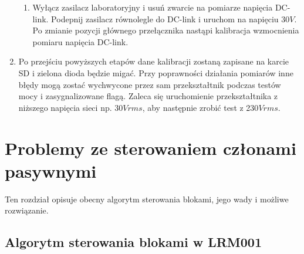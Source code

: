 \documentclass[12pt,a4paper]{article}
\begin{document}
\begin{enumerate}
\begin{enumerate}
		\item Wyłącz zasilacz laboratoryjny i usuń zwarcie na pomiarze napięcia DC-link. Podepnij zasilacz równolegle do DC-link i uruchom na napięciu 30$V$. Po zmianie pozycji głównego przełącznika nastąpi kalibracja wzmocnienia pomiaru napięcia DC-link.
		\vspace{-2mm}
	\end{enumerate}
	\item Po przejściu powyższych etapów dane kalibracji zostaną zapisane na karcie SD i zielona dioda będzie migać. Przy poprawności działania pomiarów inne błędy mogą zostać wychwycone przez sam przekształtnik podczas testów mocy i zasygnalizowane flagą. Zaleca się uruchomienie przekształtnika z niższego napięcia sieci np. 30$Vrms$, aby następnie zrobić test z 230$Vrms$.

\end{enumerate}
\clearpage
\section{Problemy ze sterowaniem członami pasywnymi}
Ten rozdział opisuje obecny algorytm sterowania blokami, jego wady i możliwe rozwiązanie.

\subsection{Algorytm sterowania blokami w LRM001}
\end{document}
